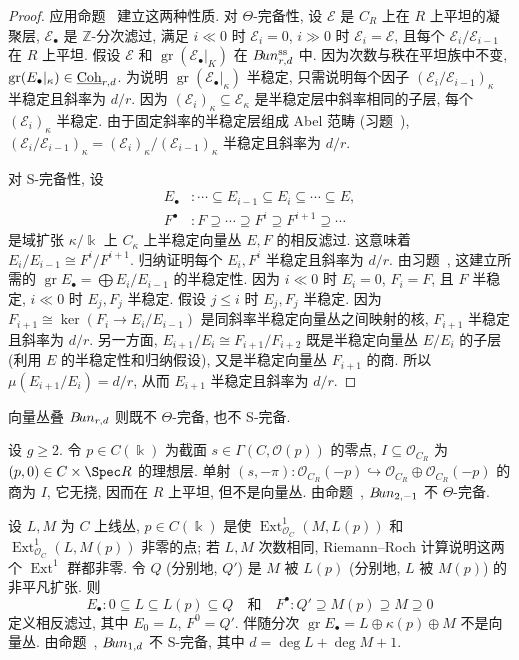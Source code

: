 \begin{proof}
应用命题~ 建立这两种性质. 对 $\Theta$-完备性, 设 $\mathcal E$ 是 $C_R$ 上在 $R$ 上平坦的凝聚层, $\mathcal E_\bullet$ 是 $\mathbb Z$-分次滤过, 满足 $i\ll0$ 时 $\mathcal E_i=0$, $i\gg0$ 时 $\mathcal E_i=\mathcal E$, 且每个 $\mathcal E_i/\mathcal E_{i-1}$ 在 $R$ 上平坦. 假设 $\mathcal E$ 和 $\operatorname{gr}(\mathcal E_\bullet|_K)$ 在 $B\!un_{r,d}^{\mathrm{ss}}$ 中. 因为次数与秩在平坦族中不变, $\operatorname{gr}(E_\bullet|_\kappa)\in\underline{\mathrm{Coh}}_{r,d}$. 为说明 $\operatorname{gr}(\mathcal E_\bullet|_\kappa)$ 半稳定, 只需说明每个因子 $(\mathcal E_i/\mathcal E_{i-1})_\kappa$ 半稳定且斜率为 $d/r$. 因为 $(\mathcal E_i)_\kappa\subseteq\mathcal E_\kappa$ 是半稳定层中斜率相同的子层, 每个 $(\mathcal E_i)_\kappa$ 半稳定. 由于固定斜率的半稳定层组成 Abel 范畴 (习题~), $(\mathcal E_i/\mathcal E_{i-1})_\kappa=(\mathcal E_i)_\kappa/(\mathcal E_{i-1})_\kappa$ 半稳定且斜率为 $d/r$.

对 S-完备性, 设
\[
\begin{aligned}
E_\bullet&:\cdots\subseteq E_{i-1}\subseteq E_i\subseteq\cdots\subseteq E,\\
F^\bullet&:F\supseteq\cdots\supseteq F^i\supseteq F^{i+1}\supseteq\cdots
\end{aligned}
\]
是域扩张 $\kappa/\Bbbk$ 上 $C_\kappa$ 上半稳定向量丛 $E,F$ 的相反滤过. 这意味着 $E_i/E_{i-1}\cong F^i/F^{i+1}$. 归纳证明每个 $E_i,F^i$ 半稳定且斜率为 $d/r$. 由习题~, 这建立所需的 $\operatorname{gr}E_\bullet=\bigoplus E_i/E_{i-1}$ 的半稳定性. 因为 $i\ll0$ 时 $E_i=0$, $F_i=F$, 且 $F$ 半稳定, $i\ll0$ 时 $E_j,F_j$ 半稳定. 假设 $j\leq i$ 时 $E_j,F_j$ 半稳定. 因为 $F_{i+1}\cong\ker(F_i\to E_i/E_{i-1})$ 是同斜率半稳定向量丛之间映射的核, $F_{i+1}$ 半稳定且斜率为 $d/r$. 另一方面, $E_{i+1}/E_i\cong F_{i+1}/F_{i+2}$ 既是半稳定向量丛 $E/E_i$ 的子层 (利用 $E$ 的半稳定性和归纳假设), 又是半稳定向量丛 $F_{i+1}$ 的商. 所以 $\mu(E_{i+1}/E_i)=d/r$, 从而 $E_{i+1}$ 半稳定且斜率为 $d/r$.
\end{proof}
向量丛叠 $B\!un_{r,d}$ 则既不 $\Theta$-完备, 也不 S-完备.
\begin{example}\label{src:9.3.9}
设 $g\geq2$. 令 $p\in C(\Bbbk)$ 为截面 $s\in\Gamma(C,\mathcal O(p))$ 的零点, $I\subseteq\mathcal O_{C_R}$ 为 $(p,0)\in C\times\Spec R$ 的理想层. 单射 $(s,-\pi):\mathcal O_{C_R}(-p)\hookrightarrow\mathcal O_{C_R}\oplus\mathcal O_{C_R}(-p)$ 的商为 $I$, 它无挠, 因而在 $R$ 上平坦, 但不是向量丛. 由命题~, $B\!un_{2,-1}$ 不 $\Theta$-完备.

设 $L,M$ 为 $C$ 上线丛, $p\in C(\Bbbk)$ 是使 $\operatorname{Ext}_{\mathcal O_C}^1(M,L(p))$ 和 $\operatorname{Ext}_{\mathcal O_C}^1(L,M(p))$ 非零的点; 若 $L,M$ 次数相同, Riemann--Roch 计算说明这两个 $\operatorname{Ext}^1$ 群都非零. 令 $Q$ (分别地, $Q'$) 是 $M$ 被 $L(p)$ (分别地, $L$ 被 $M(p)$) 的非平凡扩张. 则
\[
E_\bullet:0\subseteq L\subseteq L(p)\subseteq Q
\quad\text{和}\quad F^\bullet:Q'\supseteq M(p)\supseteq M\supseteq0
\]
定义相反滤过, 其中 $E_0=L$, $F^0=Q'$. 伴随分次 $\operatorname{gr}E_\bullet=L\oplus\kappa(p)\oplus M$ 不是向量丛. 由命题~, $B\!un_{1,d}$ 不 S-完备, 其中 $d=\deg L+\deg M+1$.
\end{example}
